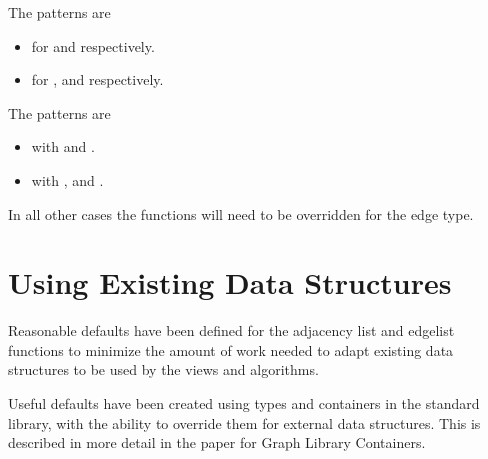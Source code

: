 The  patterns are
\begin{itemize}
    \item {} for  and  respectively.
    \item {} for ,  and  respectively.
\end{itemize}

The  patterns are
\begin{itemize}
    \item {} with  and .
    \item {} with ,  and .
\end{itemize}

In all other cases the functions will need to be overridden for the edge type.

\section{Using Existing Data Structures}
Reasonable defaults have been defined for the adjacency list and edgelist functions to minimize the amount of work
needed to adapt existing data structures to be used by the views and algorithms.

Useful defaults have been created using types and containers in the standard library, with the ability
to override them for external data structures. This is described in more detail in the paper for Graph Library 
Containers.
